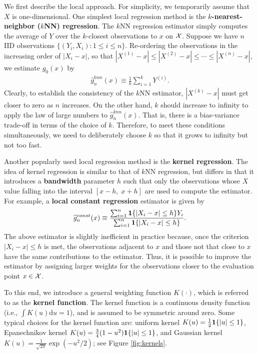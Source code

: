 \documentclass[11pt, A4paper, openany, uplatex]{book}
\begin{document}
We first describe the local approach.
For simplicity, we temporarily assume that $X$ is one-dimensional.
One simplest local regression method is the \textbf{$k$-nearest-neighbor ($k$NN) regression}.
The $k$NN regression estimator simply computes the average of $Y$ over the $k$-closest observations to $x$ on $\mathcal{X}$.
Suppose we have $n$ IID observations $\{(Y_i, X_i): 1 \le i \le n\}$.
Re-ordering the observations in the increasing order of $|X_i - x|$, so that $|X^{(1)} - x| \le |X^{(2)} - x| \le \cdots \le |X^{(n)} - x|$, we estimate $g_0(x)$ by
\begin{align*}
	\hat g^{knn}_n(x) \equiv \frac{1}{k}\sum_{i = 1}^k Y^{(i)}.
\end{align*}
Clearly, to establish the consistency of the $k$NN estimator, $|X^{(k)} - x|$ must get closer to zero as $n$ increases.
On the other hand, $k$ should increase to infinity to apply the law of large numbers to $\hat g^{knn}_n(x)$. 
That is, there is a bias-variance trade-off in terms of the choice of $k$.
Therefore, to meet these conditions simultaneously, we need to deliberately choose $k$ so that it grows to infinity but not too fast.

\bigskip

Another popularly used local regression method is the \textbf{kernel regression}.
The idea of kernel regression is similar to that of $k$NN regression, but differs in that it introduces a \textbf{bandwidth} parameter $h$ such that only the observations whose $X$ value falling into the interval $[x-h, \; x+h]$ are used to compute the estimator.
For example, a \textbf{local constant regression} estimator is given by
\begin{align*}
	\widehat g^{const}_n(x) \equiv \frac{\sum_{i = 1}^n \mathbf{1}\{|X_i - x | \le h\} Y_i}{\sum_{i = 1}^n\mathbf{1}\{|X_i - x | \le h\}}.
\end{align*}
The above estimator is slightly inefficient in practice because, once the criterion $|X_i - x | \le h$ is met, the observations adjacent to $x$ and those not that close to $x$ have the same contributions to the estimator.
Thus, it is possible to improve the estimator by assigning larger weights for the observations closer to the evaluation point $x \in \mathcal{X}$.

To this end, we introduce a general weighting function $K(\cdot)$, which is referred to as the \textbf{kernel function}.
The kernel function is a continuous density function (i.e., $\int K(u)\text{d}u = 1$), and is assumed to be symmetric around zero.
Some typical choices for the kernel function are: uniform kernel $K(u) = \frac{1}{2}\mathbf{1}\{|u| \le 1\}$, Epanechnikov kernel $K(u) = \frac{3}{4}(1-u^2)\mathbf{1}\{|u| \le 1\}$, and Gaussian kernel $K(u) = \frac{1}{\sqrt{2\pi}}\exp(-u^2/2)$; see Figure \ref{fig:kernels}.
\end{document}
